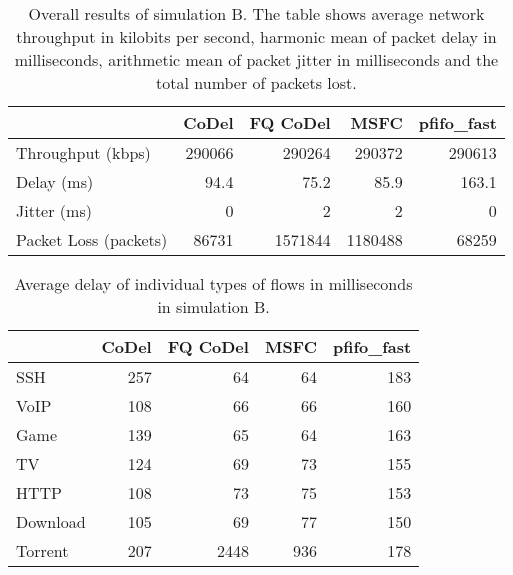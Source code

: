 \begin{table}[]
	\centering
	\begin{tabular}{@{}lrrrr@{}}
		\toprule
								& CoDel & FQ CoDel & MSFC & pfifo\_fast  \\ \midrule
		Throughput (kbps)       & 290066    & 290264 & 290372   & 290613 \\
		Delay (ms)              & 94.4      & 75.2   & 85.9     & 163.1    \\
		Jitter (ms)             & 0         & 2      & 2        & 0      \\
		Packet Loss (packets)   & 86731     & 1571844& 1180488  & 68259  \\ \bottomrule
	\end{tabular}
	\caption{Overall results of simulation B. The table shows average network throughput in kilobits per second, harmonic mean of packet delay in milliseconds, arithmetic mean of packet jitter in milliseconds and the total number of packets lost.}
	\label{tab:results_B}
\end{table}


\begin{table}

	\centering
	
	\begin{tabular}{@{}l|rrrr@{}}
		\toprule
						& CoDel & FQ CoDel & MSFC & pfifo\_fast  \\ \midrule
		SSH             &     257       &     64        &     64        &     183       \\
		VoIP            &     108       &     66        &     66        &     160       \\
		Game            &     139       &     65        &     64        &     163       \\
		TV              &     124       &     69        &     73        &     155       \\
		HTTP            &     108       &     73        &     75        &     153       \\
		Download        &     105       &     69        &     77        &     150       \\
		Torrent         &     207       &     2448      &     936      &     178       \\ \bottomrule
	\end{tabular}
	\caption{Average delay of individual types of flows in milliseconds in simulation B.}
	\label{tab:delay_B}
\end{table}

